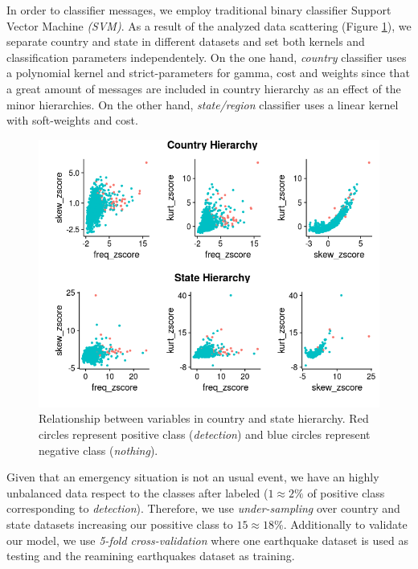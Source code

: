 \documentclass[sigconf]{acmart}
\begin{document}
In order to classifier messages, we employ traditional binary classifier Support Vector Machine \textit{(SVM)}. As a result of the analyzed data scattering (Figure \ref{fig:scatter}), we separate country and state in different datasets and set both kernels and classification parameters independentely. On the one hand, \textit{country} classifier uses a polynomial kernel and strict-parameters for gamma, cost and weights since that a great amount of messages are included in country hierarchy as an effect of the minor hierarchies. On the other hand, \textit{state/region} classifier uses a linear kernel with soft-weights and cost.

\begin{figure}
	\centering
	\includegraphics[width=\columnwidth]{img/scatter.png}
	\caption{Relationship between variables in country and state hierarchy. Red circles represent positive class (\textit{detection}) and blue circles represent negative class (\textit{nothing}).}
	\label{fig:scatter}
\end{figure}


Given that an emergency situation is not an usual event, we have an highly unbalanced data respect to the classes after labeled ($1\approx2\%$ of positive class corresponding to \textit{detection}). Therefore, we use \textit{under-sampling} \cite{lunardon2014rose} over country and state datasets increasing our possitive class to $15\approx18\%$. Additionally to validate our model, we use \textit{5-fold cross-validation} where one earthquake dataset is used as testing and the reamining earthquakes dataset as training.
\end{document}
